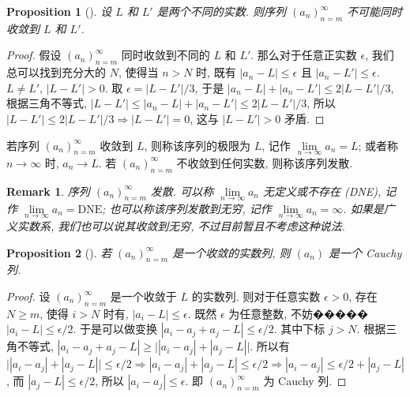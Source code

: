\documentclass[UTF8]{ctexart}
\theoremstyle{mystyle}
\newtheorem{proposition}{Proposition}[section]
\theoremstyle{myremark}
\newtheorem*{remark}{Remark}
\theoremstyle{plain}
\begin{document}
\begin{proposition}[]
    设 $ L $ 和 $ L' $ 是两个不同的实数. 则序列 $ (a_n)_{n = m}^\infty $ 不可能同时收敛到 $ L $ 和 $ L' $.
\end{proposition}

\begin{proof}
    假设 $ (a_n)_{n = m}^\infty $ 同时收敛到不同的 $ L $ 和 $ L' $. 那么对于任意正实数 $ \epsilon $, 我们总可以找到充分大的 $ N $, 使得当 $ n > N $ 时, 既有 $ |a_n - L| \leqslant \epsilon $ 且 $ |a_n - L'| \leqslant \epsilon $. $ L \neq L' $, $ |L - L'| > 0 $. 取 $ \epsilon = |L - L'| / 3 $, 于是 $ |a_n - L| + |a_n - L'| \leqslant 2 |L - L'|/3 $, 根据三角不等式, $ |L - L'|\leqslant |a_n - L| + |a_n - L'| \leqslant 2 |L - L'|/3 $, 所以 $ |L - L'| \leqslant 2 |L - L'|/3 \Longrightarrow |L - L'| = 0 $, 这与 $ |L - L'| > 0 $ 矛盾.
\end{proof}


\begin{definition}
    若序列 $ (a_n)_{n = m}^\infty $ 收敛到 $ L $, 则称该序列的极限为 $ L $, 记作 $ \lim\limits_{n \to \infty} a_n = L $; 或者称 $ n \to \infty $ 时, $ a_n \to L $. 若 $ (a_n)_{n = m}^\infty $ 不收敛到任何实数, 则称该序列发散.
\end{definition}

\begin{remark}
    序列 $ (a_n)_{n = m}^\infty $ 发散. 可以称 $ \lim\limits_{n \to \infty} a_n $ 无定义或不存在 (DNE), 记作 $ \lim\limits_{n \to \infty} a_n = \text{DNE} $; 也可以称该序列发散到无穷, 记作 $ \lim\limits_{n \to \infty} a_n = \infty $. 如果是广义实数系, 我们也可以说其收敛到无穷, 不过目前暂且不考虑这种说法.
\end{remark}

\begin{proposition}[] \label{convergent}
    若 $ (a_n)_{n = m}^\infty $ 是一个收敛的实数列, 则 $ (a_n) $ 是一个 Cauchy 列.
\end{proposition}

\begin{proof}
    设 $ (a_n)_{n = m}^\infty $ 是一个收敛于 $ L $ 的实数列. 则对于任意实数 $ \epsilon > 0 $, 存在 $ N \geqslant m $, 使得 $ i > N $ 时有, $ |a_i - L| \leqslant \epsilon $. 既然 $ \epsilon $ 为任意整数, 不妨����� $ |a_i - L| \leqslant \epsilon/2 $. 于是可以做变换 $ |a_i - a_j + a_j - L| \leqslant \epsilon/2 $. 其中下标 $ j > N $. 根据三角不等式, $ |a_i - a_j + a_j - L| \geqslant \big| |a_i - a_j| + |a_j - L| \big| $. 所以有 $ \big| |a_i - a_j| + |a_j - L| \big| \leqslant \epsilon /2 \Longrightarrow |a_i - a_j| + |a_j - L| \leqslant \epsilon / 2 \Longrightarrow |a_i - a_j| \leqslant \epsilon/2 + |a_j - L| $, 而 $ |a_j - L| \leqslant \epsilon/2 $, 所以 $ |a_i - a_j| \leqslant \epsilon $. 即 $ (a_n)_{n = m}^\infty $ 为 Cauchy 列.
\end{proof}
\end{document}
